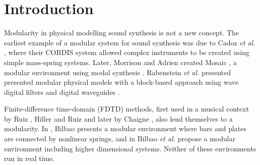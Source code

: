 \documentclass{article}
\title{\papertitle}
\begin{document}
%
\capstartfalse
\maketitle
\capstarttrue
%
\begin{abstract}
Through recent advances in processing power, physical modelling using finite-difference time-domain (FDTD) methods has gained an increased popularity. Though many different musical instrument models based on these methods exist, nearly all are based on the same underlying systems and interactions between them. This paper presents an application where individual resonator modules, such as strings, bars, membranes and plates, can be connected and interacted with in real time.  Various excitations, including the bow, hammer and pluck, are implemented as well, allowing for expressive control and a wide sonic palette. Existing and non-existing model configurations can easily be implemented, modified and experimented with, as well as the parameters describing them.
\end{abstract}
%

\section{Introduction}\label{sec:introduction}
Modularity in physical modelling sound synthesis is not a new concept. 
The earliest example of a modular system for sound synthesis was due to Cadoz \textit{et al.} \cite{Cadoz1983}, where their CORDIS system allowed complex instruments to be created using simple mass-spring systems. Later, Morrison and Adrien created Mosaic \cite{Morrison1993}, a modular environment using modal synthesis \cite{Adrien1991}. Rabenstein \textit{et al.} presented presented modular physical models with a block-based approach using wave digital filters \cite{Rabenstein2007} and digital waveguides \cite{Smith1992}. 

Finite-difference time-domain (FDTD) methods, first used in a musical context by Ruiz \cite{Ruiz1969}, Hiller and Ruiz \cite{Hiller1971I, Hiller1971II} and later by Chaigne \cite{Chaigne1992}, also lend themselves to a modularity. In \cite{Bilbao2009Modular}, Bilbao presents a modular environment where bars and plates are connected by nonlinear springs, and in \cite{Bilbao2014} Bilbao \textit{et al.} propose a modular environment including higher dimensional systems. Neither of these environments run in real time.
\end{document}
